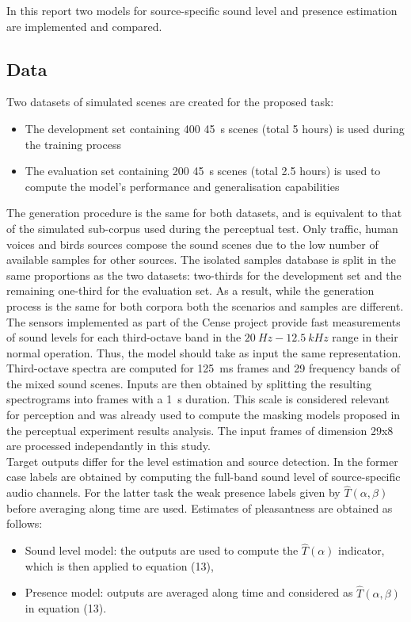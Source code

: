 \documentclass[11pt,a4paper]{article}
\begin{document}
In this report two models for source-specific sound level and presence estimation are implemented and compared.

\subsection{Data}

Two datasets of simulated scenes are created for the proposed task:
\begin{itemize}
\item The development set containing 400 45~s scenes (total 5 hours) is used during the training process
\item The evaluation set containing 200 45~s scenes (total 2.5 hours) is used to compute the model's performance and generalisation capabilities
\end{itemize}

The generation procedure is the same for both datasets, and is equivalent to that of the simulated sub-corpus used during the perceptual test. Only traffic, human voices and birds sources compose the sound scenes due to the low number of available samples for other sources. The isolated samples database is split in the same proportions as the two datasets: two-thirds for the development set and the remaining one-third for the evaluation set. As a result, while the generation process is the same for both corpora both the scenarios and samples are different.\\

The sensors implemented as part of the Cense project provide fast measurements of sound levels for each third-octave band in the $20~Hz - 12.5~kHz$ range in their normal operation. Thus, the model should take as input the same representation. Third-octave spectra are computed for 125~ms frames and 29 frequency bands of the mixed sound scenes. Inputs are then obtained by splitting the resulting spectrograms into frames with a 1~s duration. This scale is considered relevant for perception and was already used to compute the masking models proposed in the perceptual experiment results analysis. The input frames of dimension 29x8 are processed independantly in this study.\\

Target outputs differ for the level estimation and source detection. In the former case labels are obtained by computing the full-band sound level of source-specific audio channels. For the latter task the weak presence labels given by $\hat T(\alpha, \beta)$ before averaging along time are used. Estimates of pleasantness are obtained as follows:
\begin{itemize}
\item Sound level model: the outputs are used to compute the $\hat T(\alpha)$ indicator, which is then applied to equation (13),
\item Presence model: outputs are averaged along time and considered as $\hat T(\alpha, \beta)$ in equation (13).
\end{itemize}
\end{document}
